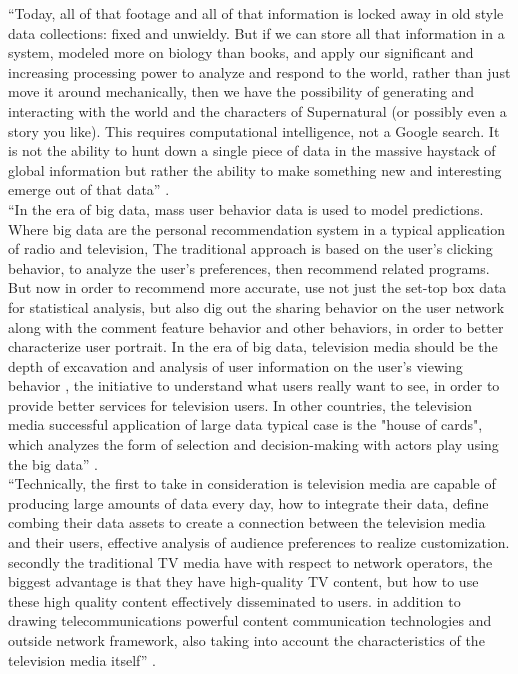\documentclass[sigconf]{acmart}
\begin{document}
``Today, all of that footage and all of that information is locked away in old style data collections: fixed and unwieldy. But if we can store all that information in a system, modeled more on biology than books, and apply our significant and increasing processing power to analyze and respond to the world, rather than just move it around mechanically, then we have the possibility of generating and interacting with the world and the characters of Supernatural (or possibly even a story you like). This requires computational intelligence, not a Google search. It is not the ability to hunt down a single piece of data in the massive haystack of global information but rather the ability to make something new and interesting emerge out of that data'' \cite{Schlieski2012data}. \\
``In the era of big data, mass user behavior data is used to model predictions. Where big data are the personal recommendation system in a typical application of radio and television, The traditional approach is based on the user's clicking behavior, to analyze the user's preferences, then recommend related programs. But now in order to recommend more accurate, use not just the set-top box data for statistical analysis, but also dig out the sharing behavior on the user network along with the comment feature behavior and other behaviors, in order to better characterize user portrait. In the era of big data, television media should be the depth of excavation and analysis of user information on the user's viewing behavior , the initiative to understand what users really want to see, in order to provide better services for television users. In other countries, the television media successful application of large data typical case is the "house of cards", which analyzes the form of selection and decision-making with actors play using the big data'' \cite{Zhang2017era}. \\
``Technically, the first to take in consideration is television media are capable of producing large amounts of data every day, how to integrate their data, define combing their data assets to create a connection between the television media and their users, effective analysis of audience preferences to realize customization. secondly the traditional TV media have with respect to network operators, the biggest advantage is that they have high-quality TV content, but how to use these high quality content effectively disseminated to users. in addition to drawing telecommunications powerful content communication technologies and outside network framework, also taking into account the characteristics of the television media itself'' \cite{Zhang2017era}. \\
\end{document}
